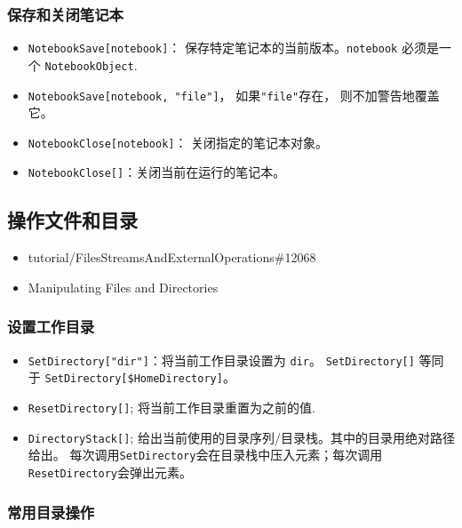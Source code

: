 \subsubsection{保存和关闭笔记本}

\begin{itemize}
\item \verb`NotebookSave[notebook]`： 保存特定笔记本的当前版本。\verb`notebook` 必须是一个 \verb`NotebookObject`.
\item \verb`NotebookSave[notebook, "file"]`， 如果\verb`"file"`存在， 则不加警告地覆盖它。
\item \verb`NotebookClose[notebook]`： 关闭指定的笔记本对象。
\item \verb`NotebookClose[]`：关闭当前在运行的笔记本。
\end{itemize}

\subsection{操作文件和目录}

\begin{itemize}
\item tutorial/FilesStreamsAndExternalOperations\#12068
\item Manipulating Files and Directories
\end{itemize}

\subsubsection{设置工作目录}

\begin{itemize}
\item \verb`SetDirectory["dir"]`：将当前工作目录设置为 \verb`dir`。
\verb`SetDirectory[]` 等同于 \verb`SetDirectory[$HomeDirectory]`。
\item \verb`ResetDirectory[]`; 将当前工作目录重置为之前的值.
\item \verb`DirectoryStack[]`; 给出当前使用的目录序列/目录栈。其中的目录用绝对路径给出。
每次调用\verb`SetDirectory`会在目录栈中压入元素；每次调用\verb`ResetDirectory`会弹出元素。

\end{itemize}

\subsubsection{常用目录操作}

